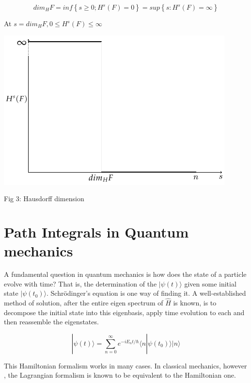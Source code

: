\documentclass[14pt]{extarticle}
\begin{document}
$$ dim_H F =inf \left\lbrace s \geq 0; H^s(F)=0 \right\rbrace = sup \left\lbrace s: H^s(F)=\infty \right\rbrace$$ 

At $ s=dim_H F, 0\leq H^s(F) \leq \infty$

\begin{center}

\includegraphics[scale=1]{1111.png}
\linebreak

Fig 3: Hausdorff dimension

\end{center}

\newpage


\section{Path Integrals in Quantum mechanics}

A fundamental question in quantum mechanics is how does the state of a particle evolve with time? That is, the determination of the   $|\psi(t)\rangle$ given some initial state $|\psi(t_0)\rangle$. Schrödinger’s equation is one way of finding it. A well-established method of solution, after the entire eigen spectrum of $\hat{H}$ is known, is to decompose the initial state into this eigenbasis, apply time evolution to each and then reassemble the eigenstates.

$$|\psi(t)\rangle = \sum_{n=0}^{\infty} e^{-iE_n t/\hbar} \langle n|\psi(t_0) \rangle |n \rangle$$

This Hamiltonian formalism works in many cases. In classical mechanics, however , the Lagrangian formalism is known to be equivalent to the Hamiltonian one.\\
\end{document}

